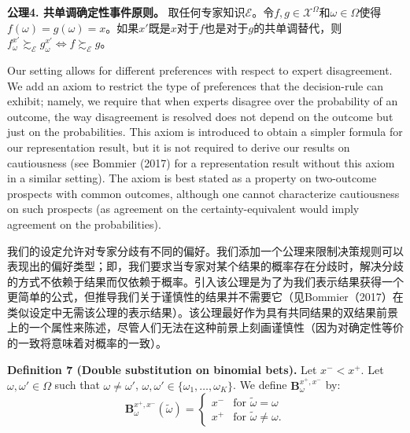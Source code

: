 \documentclass[12pt,a4paper]{article}
\newenvironment{original}
  {\par\noindent\ignorespaces}
  {\par}
\newenvironment{translation}
  {\par\noindent{\color{transblue}\ignorespaces}}
  {\par\medskip}
\begin{document}
\begin{translation}
\textbf{公理4. 共单调确定性事件原则。} 取任何专家知识$\mathcal{E}$。令$f, g \in \mathcal{X}^{\Omega}$和$\omega \in \Omega$使得$f(\omega) = g(\omega) = x$。如果$x'$既是$x$对于$f$也是对于$g$的共单调替代，则$f^{x'}_{\omega} \succsim_{\mathcal{E}} g^{x'}_{\omega} \iff f \succsim_{\mathcal{E}} g$。
\end{translation}

\begin{original}
Our setting allows for different preferences with respect to expert disagreement. We add an axiom to restrict the type of preferences that the decision-rule can exhibit; namely, we require that when experts disagree over the probability of an outcome, the way disagreement is resolved does not depend on the outcome but just on the probabilities. This axiom is introduced to obtain a simpler formula for our representation result, but it is not required to derive our results on cautiousness (see Bommier (2017) for a representation result without this axiom in a similar setting). The axiom is best stated as a property on two-outcome prospects with common outcomes, although one cannot characterize cautiousness on such prospects (as agreement on the certainty-equivalent would imply agreement on the probabilities).
\end{original}

\begin{translation}
我们的设定允许对专家分歧有不同的偏好。我们添加一个公理来限制决策规则可以表现出的偏好类型；即，我们要求当专家对某个结果的概率存在分歧时，解决分歧的方式不依赖于结果而仅依赖于概率。引入该公理是为了为我们表示结果获得一个更简单的公式，但推导我们关于谨慎性的结果并不需要它（见Bommier（2017）在类似设定中无需该公理的表示结果）。该公理最好作为具有共同结果的双结果前景上的一个属性来陈述，尽管人们无法在这种前景上刻画谨慎性（因为对确定性等价的一致将意味着对概率的一致）。
\end{translation}

\begin{original}
\textbf{Definition 7 (Double substitution on binomial bets).} Let $x^{-} < x^{+}$. Let $\omega, \omega' \in \Omega$ such that $\omega \neq \omega'$, $\omega, \omega' \in \{\omega_{1}, \dots, \omega_{K}\}$. We define $\mathbf{B}^{x^{+},x^{-}}_{\omega}$ by:
\[
\mathbf{B}^{x^{+},x^{-}}_{\omega}(\tilde{\omega}) =
\begin{cases}
x^{-} & \text{for } \tilde{\omega} = \omega\\
x^{+} & \text{for } \tilde{\omega} \neq \omega.
\end{cases}
\]
\end{original}
\end{document}
